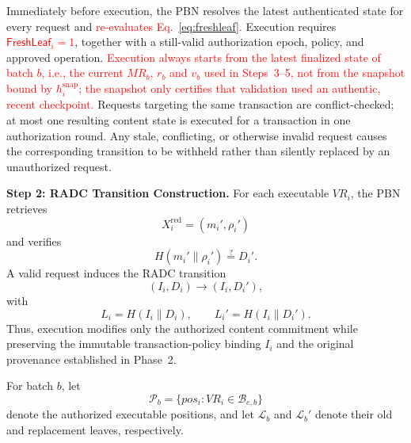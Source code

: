 \documentclass[lettersize,journal]{IEEEtran}
\begin{document}
Immediately before execution, the PBN resolves the latest authenticated
state for every request and \textcolor{red}{re-evaluates
Eq.~\eqref{eq:freshleaf}.}
Execution requires
\textcolor{red}{$\mathsf{FreshLeaf}_i=1$},
together with a still-valid authorization epoch, policy, and approved
operation. \textcolor{red}{Execution always starts from the latest
finalized state of batch $b$, i.e., the current $MR_b$, $r_b$ and $v_b$
used in Steps~3--5, not from the snapshot bound by $h_i^{\mathrm{snap}}$;
the snapshot only certifies that validation used an authentic, recent
checkpoint.} Requests targeting the same transaction are conflict-checked;
at most one resulting content state is executed for a transaction in
one authorization round. Any stale, conflicting, or otherwise invalid
request causes the corresponding transition to be withheld rather than
silently replaced by an unauthorized request.

\medskip
\noindent\textbf{Step 2: RADC Transition Construction.}
For each executable $VR_i$, the PBN retrieves
\begin{equation}
X_i^{\mathrm{red}}=(m_i',\rho_i')
\end{equation}
and verifies
\begin{equation}
H(m_i'\parallel\rho_i')
\stackrel{?}{=}D_i'.
\end{equation}
A valid request induces the RADC transition
\begin{equation}
(I_i,D_i)\longrightarrow(I_i,D_i'),
\end{equation}
with
\begin{equation}
L_i=H(I_i\parallel D_i),
\qquad
L_i'=H(I_i\parallel D_i').
\end{equation}
Thus, execution modifies only the authorized content commitment while
preserving the immutable transaction-policy binding $I_i$ and the
original provenance established in Phase~2.

For batch $b$, let
\begin{equation}
\mathcal{P}_b=
\{pos_i:VR_i\in\mathcal{B}_{e,b}\}
\end{equation}
denote the authorized executable positions, and let
$\mathcal{L}_b$ and $\mathcal{L}_b'$ denote their old and replacement
leaves, respectively.
\end{document}
